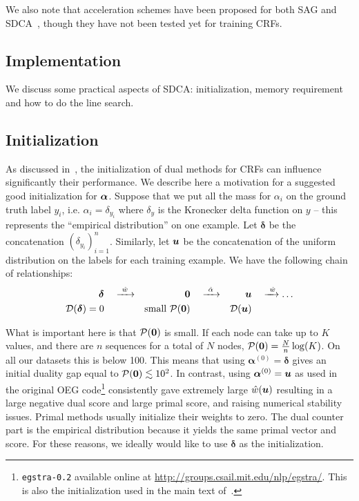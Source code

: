 We also note that acceleration schemes have been proposed for both SAG and SDCA~\citep{lin2015catalyst, shalev2016accelerated}, though they have not been tested yet for training CRFs.



\clearpage
\begin{subappendices}

\section{Implementation} \label{app:sec:implementation}
We discuss some practical aspects of SDCA: initialization, memory requirement and how to do the line search.

\subsection{Initialization}\label{app:ssec:initialization}

As discussed in~\citet{schmidt2015non}, the initialization of dual methods for CRFs can influence significantly their performance.
We describe here a motivation for a suggested good initialization for $\boldsymbol{\alpha}$.
Suppose that we put all the mass for $\alpha_i$ on the ground truth label $y_i$, i.e. $\alpha_i = \delta_{y_i}$ where $\delta_y$ is the Kronecker delta function on $y$ -- this represents the ``empirical distribution'' on one example.
Let $\bm\delta$ be the concatenation $(\delta_{y_i})_{i=1} ^n$.
Similarly, let $\bm u$ be the concatenation of the uniform distribution on the labels for each training example.
We have the following chain of relationships:
\begin{align*}
	\bm\delta & \quad \xrightarrow{~\hat w~} & \bm{0} & \quad \xrightarrow{~\hat \alpha~} & \bm u & \quad \xrightarrow{~\hat w} \dots \\
	{\mathcal D}(\bm\delta)=0 &  & \text{small } {\mathcal P}(\bm{0}) &  & {\mathcal D}(\bm u) &
\end{align*}

What is important here is that ${\mathcal P}(\bm{0})$ is small.
If each node can take up to $K$ values, and there are $n$ sequences for a total of $N$ nodes, ${\mathcal P}(\bm{0}) = \frac{N}{n}\log(K)$.
On all our datasets this is below 100.
This means that using $\bm{\alpha}^{(0)}=\bm\delta$ gives an initial duality gap equal to ${\mathcal P}(\bm{0})\lesssim10^2$.
In contrast, using $\bm{\alpha}^{(0)} = \bm u$ as used in the original OEG code\footnote{\texttt{egstra-0.2} available online at \url{http://groups.csail.mit.edu/nlp/egstra/}. This is also the initialization used in the main text of~\citet{schmidt2015non}.} consistently gave extremely large $\hat w(\bm u)$ resulting in a large negative dual score and large primal score, and raising numerical stability issues.
Primal methods usually initialize their weights to zero.
The dual counter part is the empirical distribution because it yields the same primal vector and score.
For these reasons, we ideally would like to use $\bm\delta$ as the initialization.


\end{subappendices}
